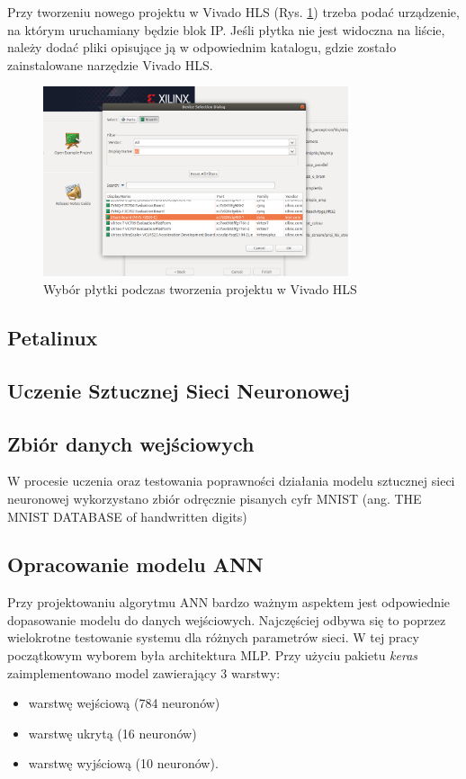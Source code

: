 Przy tworzeniu nowego projektu w Vivado HLS (Rys. \ref{hls_new_project}) trzeba podać 
urządzenie, na którym uruchamiany będzie blok IP. Jeśli płytka nie jest widoczna na 
liście, należy dodać pliki opisujące ją w odpowiednim katalogu, gdzie zostało 
zainstalowane narzędzie Vivado HLS.  

\begin{figure}
  \centering
  \includegraphics[width=0.8\textwidth]{img/vivado-hls-new.png}
  \caption{Wybór płytki podczas tworzenia projektu w Vivado HLS}
  \label{hls_new_project}
\end{figure}


\subsection{Petalinux}

\subsection{Uczenie Sztucznej Sieci Neuronowej}

\subsection{Zbiór danych wejściowych}

W procesie uczenia oraz testowania poprawności działania modelu sztucznej 
sieci neuronowej wykorzystano zbiór odręcznie pisanych cyfr MNIST 
(ang. THE MNIST DATABASE of handwritten digits)
\cite{lecun-mnisthandwrittendigit-2010}


\subsection{Opracowanie modelu ANN}

Przy projektowaniu algorytmu ANN bardzo ważnym aspektem jest odpowiednie dopasowanie 
modelu do danych wejściowych. Najczęściej odbywa się to poprzez wielokrotne testowanie
systemu dla różnych parametrów sieci. W tej pracy początkowym wyborem była architektura
MLP. Przy użyciu pakietu \emph{keras} zaimplementowano model zawierający 3 warstwy:
\begin{itemize}
  \item warstwę wejściową (784 neuronów)
  \item warstwę ukrytą (16 neuronów)
  \item warstwę wyjściową (10 neuronów).
\end{itemize}

